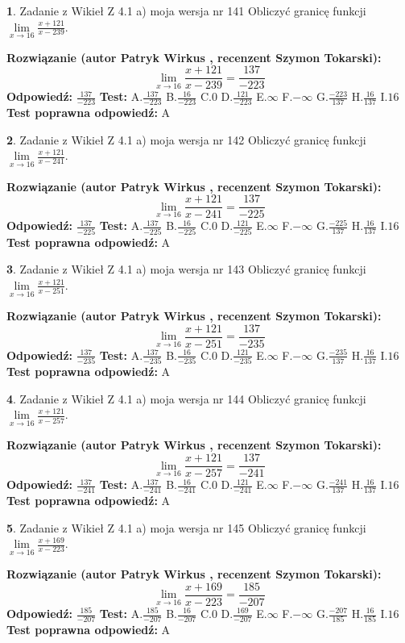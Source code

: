 \documentclass[12pt, a4paper]{article}
\theoremstyle{definition} %
\newtheorem{zad}{}
\newcommand{\zadStart}[1]{\begin{zad}#1\newline}
\newcommand{\zadStop}{\end{zad}}
\newcommand{\rozwStart}[2]{\noindent \textbf{Rozwiązanie (autor #1 , recenzent #2): }\newline}
\newcommand{\rozwStop}{\newline}
\newcommand{\odpStart}{\noindent \textbf{Odpowiedź:}\newline}
\newcommand{\odpStop}{\newline}
\newcommand{\testStart}{\noindent \textbf{Test:}\newline}
\newcommand{\testStop}{\newline}
\newcommand{\kluczStart}{\noindent \textbf{Test poprawna odpowiedź:}\newline}
\newcommand{\kluczStop}{\newline}
\begin{document}
\zadStart{Zadanie z Wikieł Z 4.1 a) moja wersja nr 141}
Obliczyć granicę funkcji $\lim\limits_{x\to16}\frac{x+121}{x-239}$.
\zadStop
\rozwStart{Patryk Wirkus}{Szymon Tokarski}
$$\lim\limits_{x\to16}\frac{x+121}{x-239} = \frac{137}{-223}$$
\rozwStop
\odpStart
$\frac{137}{-223}$
\odpStop
\testStart
A.$\frac{137}{-223}$
B.$\frac{16}{-223}$
C.$0$
D.$\frac{121}{-223}$
E.$\infty$
F.$-\infty$
G.$\frac{-223}{137}$
H.$\frac{16}{137}$
I.$16$
\testStop
\kluczStart
A
\kluczStop



\zadStart{Zadanie z Wikieł Z 4.1 a) moja wersja nr 142}
Obliczyć granicę funkcji $\lim\limits_{x\to16}\frac{x+121}{x-241}$.
\zadStop
\rozwStart{Patryk Wirkus}{Szymon Tokarski}
$$\lim\limits_{x\to16}\frac{x+121}{x-241} = \frac{137}{-225}$$
\rozwStop
\odpStart
$\frac{137}{-225}$
\odpStop
\testStart
A.$\frac{137}{-225}$
B.$\frac{16}{-225}$
C.$0$
D.$\frac{121}{-225}$
E.$\infty$
F.$-\infty$
G.$\frac{-225}{137}$
H.$\frac{16}{137}$
I.$16$
\testStop
\kluczStart
A
\kluczStop



\zadStart{Zadanie z Wikieł Z 4.1 a) moja wersja nr 143}
Obliczyć granicę funkcji $\lim\limits_{x\to16}\frac{x+121}{x-251}$.
\zadStop
\rozwStart{Patryk Wirkus}{Szymon Tokarski}
$$\lim\limits_{x\to16}\frac{x+121}{x-251} = \frac{137}{-235}$$
\rozwStop
\odpStart
$\frac{137}{-235}$
\odpStop
\testStart
A.$\frac{137}{-235}$
B.$\frac{16}{-235}$
C.$0$
D.$\frac{121}{-235}$
E.$\infty$
F.$-\infty$
G.$\frac{-235}{137}$
H.$\frac{16}{137}$
I.$16$
\testStop
\kluczStart
A
\kluczStop



\zadStart{Zadanie z Wikieł Z 4.1 a) moja wersja nr 144}
Obliczyć granicę funkcji $\lim\limits_{x\to16}\frac{x+121}{x-257}$.
\zadStop
\rozwStart{Patryk Wirkus}{Szymon Tokarski}
$$\lim\limits_{x\to16}\frac{x+121}{x-257} = \frac{137}{-241}$$
\rozwStop
\odpStart
$\frac{137}{-241}$
\odpStop
\testStart
A.$\frac{137}{-241}$
B.$\frac{16}{-241}$
C.$0$
D.$\frac{121}{-241}$
E.$\infty$
F.$-\infty$
G.$\frac{-241}{137}$
H.$\frac{16}{137}$
I.$16$
\testStop
\kluczStart
A
\kluczStop



\zadStart{Zadanie z Wikieł Z 4.1 a) moja wersja nr 145}
Obliczyć granicę funkcji $\lim\limits_{x\to16}\frac{x+169}{x-223}$.
\zadStop
\rozwStart{Patryk Wirkus}{Szymon Tokarski}
$$\lim\limits_{x\to16}\frac{x+169}{x-223} = \frac{185}{-207}$$
\rozwStop
\odpStart
$\frac{185}{-207}$
\odpStop
\testStart
A.$\frac{185}{-207}$
B.$\frac{16}{-207}$
C.$0$
D.$\frac{169}{-207}$
E.$\infty$
F.$-\infty$
G.$\frac{-207}{185}$
H.$\frac{16}{185}$
I.$16$
\testStop
\kluczStart
A
\kluczStop
\end{document}
